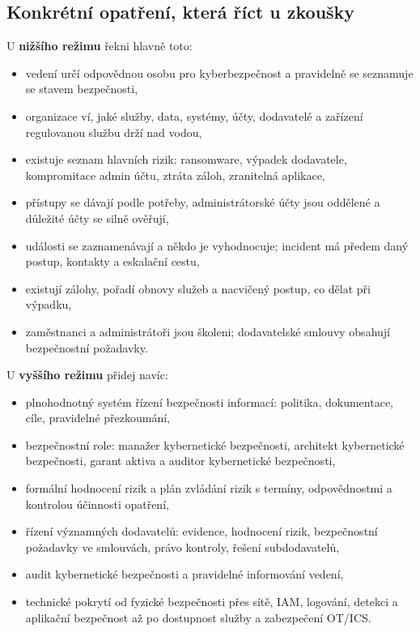 \documentclass[11pt,a4paper]{article}
\begin{document}
\subsection*{Konkrétní opatření, která říct u zkoušky}
U \textbf{nižšího režimu} řekni hlavně toto:
\begin{itemize}
  \item vedení určí odpovědnou osobu pro kyberbezpečnost a pravidelně se seznamuje se stavem bezpečnosti,
  \item organizace ví, jaké služby, data, systémy, účty, dodavatelé a zařízení regulovanou službu drží nad vodou,
  \item existuje seznam hlavních rizik: ransomware, výpadek dodavatele, kompromitace admin účtu, ztráta záloh, zranitelná aplikace,
  \item přístupy se dávají podle potřeby, administrátorské účty jsou oddělené a důležité účty se silně ověřují,
  \item události se zaznamenávají a někdo je vyhodnocuje; incident má předem daný postup, kontakty a eskalační cestu,
  \item existují zálohy, pořadí obnovy služeb a nacvičený postup, co dělat při výpadku,
  \item zaměstnanci a administrátoři jsou školeni; dodavatelské smlouvy obsahují bezpečnostní požadavky.
\end{itemize}

U \textbf{vyššího režimu} přidej navíc:
\begin{itemize}
  \item plnohodnotný systém řízení bezpečnosti informací: politika, dokumentace, cíle, pravidelné přezkoumání,
  \item bezpečnostní role: manažer kybernetické bezpečnosti, architekt kybernetické bezpečnosti, garant aktiva a auditor kybernetické bezpečnosti,
  \item formální hodnocení rizik a plán zvládání rizik s termíny, odpovědnostmi a kontrolou účinnosti opatření,
  \item řízení významných dodavatelů: evidence, hodnocení rizik, bezpečnostní požadavky ve smlouvách, právo kontroly, řešení subdodavatelů,
  \item audit kybernetické bezpečnosti a pravidelné informování vedení,
  \item technické pokrytí od fyzické bezpečnosti přes sítě, IAM, logování, detekci a aplikační bezpečnost až po dostupnost služby a zabezpečení OT/ICS.
\end{itemize}
\end{document}
